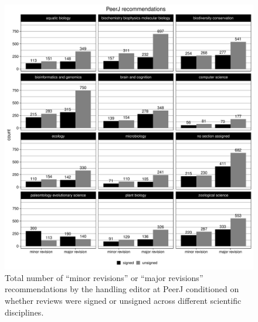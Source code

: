 \documentclass[
  english,
  ,jou, a4paper,floatsintext]{apa6}
\begin{document}
\begin{figure}
\centering
\includegraphics{open_peer_review_files/figure-latex/PeerJrecperfield-1.pdf}
\caption{\label{fig:PeerJrecperfield}Total number of \enquote{minor revisions} or \enquote{major revisions} recommendations by the handling editor at PeerJ conditioned on whether reviews were signed or unsigned across different scientific disciplines.}
\end{figure}
\end{document}
